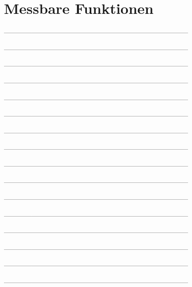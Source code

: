 \setcounter{exercise}{0}

\section{Messbare Funktionen}

--------------------------------------------------------------------------------



--------------------------------------------------------------------------------



--------------------------------------------------------------------------------



--------------------------------------------------------------------------------



--------------------------------------------------------------------------------



--------------------------------------------------------------------------------



--------------------------------------------------------------------------------



--------------------------------------------------------------------------------



--------------------------------------------------------------------------------



--------------------------------------------------------------------------------



--------------------------------------------------------------------------------



--------------------------------------------------------------------------------



--------------------------------------------------------------------------------



--------------------------------------------------------------------------------



--------------------------------------------------------------------------------



--------------------------------------------------------------------------------

